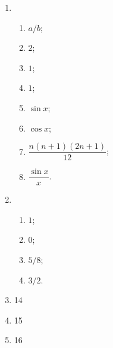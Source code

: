 \documentclass[12pt]{ctexart}
\begin{document}
\begin{enumerate}
\begin{enumerate}[(1)]
                $0$;
            \item %
                $\lim\limits_{n\to1}\dfrac{x^m-1}{x-1} = \lim\limits_{n\to1}\dfrac{1-x^m}{1-x} = \lim\limits_{n\to1}(1 + x + \cdots + x^{m-1}) = m$;
            \item %
                $\lim\limits_{n\to1}\dfrac{x^m-1}{x^n-1} = \lim\limits_{n\to1}\dfrac{(1-x^m)/(1-x)}{(1-x^n)/(1-x)} = \dfrac mn$;
            \item %
                $1/2$;
            \item %
                $1$;
            \item %
                $1/m$;
            \item %
                $\dfrac{m(m+1)}{2}$.
        \end{enumerate}
    \item %
        \begin{enumerate}[(1)]
            \item %
                $a/b$;
            \item %
                $2$;
            \item %
                $1$;
            \item %
                $1$;
            \item %
                $\sin x$;
            \item %
                $\cos x$;
            \item %
                $\dfrac{n(n+1)(2n+1)}{12}$;
            \item %
                $\dfrac{\sin x}{x}$.
        \end{enumerate}
    \item %
        \begin{enumerate}[(1)]
            \item %
                $1$;
            \item %
                $0$;
            \item %
                $5/8$;
            \item %
                $3/2$.
        \end{enumerate}
    \item 14
    \item 15
    \item 16
\end{enumerate}
\end{document}
